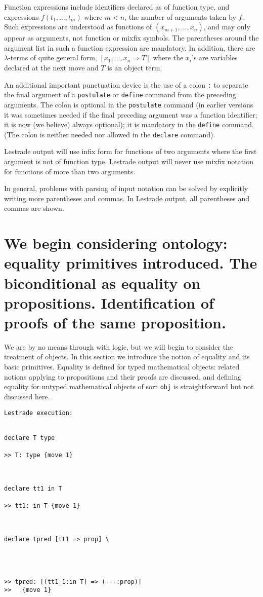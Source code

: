 \documentclass[12pt]{article}
\begin{document}
Function expressions include identifiers declared as of function type, and expressions $f(t_1,\ldots,t_m)$ where $m<n$, the number of arguments taken by $f$.  Such expressions are understood as functions of $(x_{m+1},\ldots,x_n)$, and may only appear as arguments, not function or mixfix symbols.  The parentheses around the argument list in such a function expression are mandatory.  In addition, there are $\lambda$-terms of quite general form, $[x_1,\ldots,x_n \Rightarrow T]$ where the $x_i$'s are variables declared at the next move and $T$ is an object term.

An additional important punctuation device is the use of a colon {\tt :} to separate the final argument of a {\tt postulate} or {\tt define} command from the preceding arguments.  The colon is optional in the {\tt postulate} command (in earlier versions it was sometimes needed if the final preceding argument was a function identifier; it is now (we believe) always optional); it is mandatory in the {\tt define} command.  (The colon is neither needed nor allowed in the {\tt declare} command).

Lestrade output will use infix form for functions of two arguments where the first argument is not of function type.  Lestrade output will never use mixfix notation for functions of more than two arguments.

In general, problems with parsing of input notation can be solved by explicitly writing more parentheses and commas.  In Lestrade  output, all parentheses and commas are shown.

\section{We begin considering ontology:  equality primitives introduced.  The biconditional as equality on propositions.  Identification of proofs of the same proposition.}

We are by no means through with logic, but we will begin to consider the treatment of objects.  In this section we introduce the notion of equality and its basic primitives.  Equality is defined for typed mathematical objects:  related notions applying to propositions and their proofs are discussed, and defining equality for untyped mathematical objects of sort {\tt obj} is straightforward but not discussed here.

\begin{verbatim}Lestrade execution:


declare T type

>> T: type {move 1}



declare tt1 in T

>> tt1: in T {move 1}



declare tpred [tt1 => prop] \
   



>> tpred: [(tt1_1:in T) => (---:prop)]
>>   {move 1}


\end{verbatim}
\end{document}
